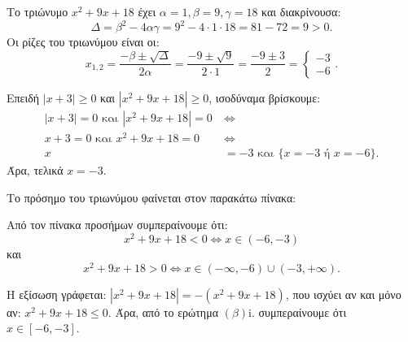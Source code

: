 
\begin{alist}
\item
\begin{rlist}
\item Το τριώνυμο $x^2 + 9x + 18$ έχει $\alpha = 1, \beta = 9, \gamma = 18$ και διακρίνουσα:
\[\Delta = \beta^2 - 4\alpha\gamma = 9^2 - 4 \cdot 1 \cdot 18 = 81 - 72 = 9 > 0.\]
Οι ρίζες του τριωνύμου είναι οι:
\[x_{1,2} = \dfrac{-\beta \pm \sqrt{\Delta}}{2\alpha} = \dfrac{-9 \pm \sqrt{9}}{2 \cdot 1} = \dfrac{-9 \pm 3}{2} = \begin{cases} -3 \\ -6 \end{cases}.\]

\item Επειδή $|x + 3| \ge 0$ και $|x^2 + 9x + 18| \ge 0$, ισοδύναμα βρίσκουμε:
\begin{align*}
|x + 3| = 0 \text{ και } |x^2 + 9x + 18| = 0 \ &\Leftrightarrow \\
x + 3 = 0 \text{ και } x^2 + 9x + 18 = 0 \ &\Leftrightarrow \\
x &= -3 \text{ και } \{x = -3 \text{ ή } x = -6\}.
\end{align*}
Άρα, τελικά $x = -3$.
\end{rlist}

\item
\begin{rlist}
\item Το πρόσημο του τριωνύμου φαίνεται στον παρακάτω πίνακα:

\begin{center}
\end{center}

Από τον πίνακα προσήμων συμπεραίνουμε ότι:
\[x^2 + 9x + 18 < 0 \Leftrightarrow x \in (-6, -3)\]
και
\[x^2 + 9x + 18 > 0 \Leftrightarrow x \in (-\infty, -6) \cup (-3, +\infty).\]

\item Η εξίσωση γράφεται:
$|x^2 + 9x + 18| = -(x^2 + 9x + 18)$,
που ισχύει αν και μόνο αν:
$x^2 + 9x + 18 \le 0$.
Άρα, από το ερώτημα $(\beta)$i. συμπεραίνουμε ότι $x \in [-6, -3]$.
\end{rlist}
\end{alist}

